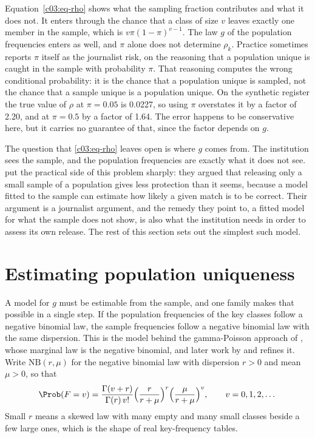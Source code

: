 Equation~\eqref{c03:eq-rho} shows what the sampling fraction contributes and what it
does not. It enters through the chance that a class of size $v$ leaves exactly one
member in the sample, which is $v\pi(1-\pi)^{v-1}$. The law $g$ of the population
frequencies enters as well, and $\pi$ alone does not determine $\rho_k$. Practice
sometimes reports $\pi$ itself as the journalist risk, on the reasoning that a
population unique is caught in the sample with probability $\pi$. That reasoning
computes the wrong conditional probability: it is the chance that a population unique
is sampled, not the chance that a sample unique is a population unique. On the
synthetic register the true value of $\rho$ at $\pi = 0.05$ is 0.0227, so using $\pi$
overstates it by a factor of 2.20, and at $\pi = 0.5$ by a factor of 1.64.
The error happens to be conservative here, but it carries no guarantee of that, since
the factor depends on $g$.

The question that \eqref{c03:eq-rho} leaves open is where $g$ comes from. The
institution sees the sample, and the population frequencies are exactly what it does
not see. \citet{rocher2019} put the practical side of this problem sharply: they argued
that releasing only a small sample of a population gives less protection than it seems,
because a model fitted to the sample can estimate how likely a given match is to be
correct. Their argument is a journalist argument, and the remedy they point to, a fitted
model for what the sample does not show, is also what the institution needs in order to
assess its own release. The rest of this section sets out the simplest such model.

\section{Estimating population uniqueness}

A model for $g$ must be estimable from the sample, and one family makes that possible in
a single step. If the population frequencies of the key classes follow a negative
binomial law, the sample frequencies follow a negative binomial law with the same
dispersion. This is the model behind the gamma-Poisson approach of
\citet{bethlehem1990}, whose marginal law is the negative binomial, and later work by
\citet{rinott2006} and \citet{shlomoskinner2010} refines it. Write
$\mathrm{NB}(r,\mu)$ for the negative binomial law with dispersion $r > 0$ and mean
$\mu > 0$, so that
\begin{equation}\label{c03:eq-nb}
\Prob(F = v) = \frac{\Gamma(v+r)}{\Gamma(r)\,v!}\Big(\frac{r}{r+\mu}\Big)^{r}
\Big(\frac{\mu}{r+\mu}\Big)^{v}, \qquad v = 0, 1, 2, \dots
\end{equation}
Small $r$ means a skewed law with many empty and many small classes beside a few large
ones, which is the shape of real key-frequency tables.

